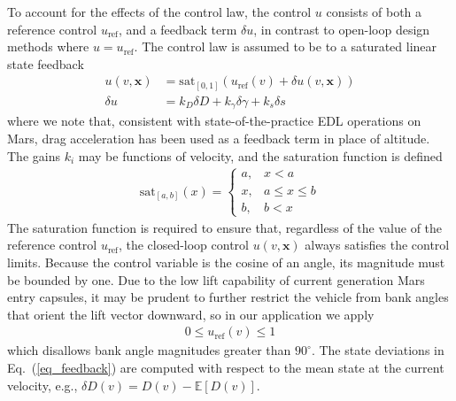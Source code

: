\documentclass[journal ]{new-aiaa}
\newcommand{\state}{\ensuremath{\mathbf{x}}}
\newcommand{\ur}{\ensuremath{u_{\mathrm{ref}}}}
\newcommand{\E}[1]{\mathbb{E}\left[#1\right]}
\begin{document}
To account for the effects of the control law, the control $u$ consists of both a reference control $\ur$, and a feedback term $\delta u$, in contrast to open-loop design methods where $u=\ur$. 
The control law is assumed to be to a saturated linear state feedback 
\begin{align}
u(v,\state) &= \mathrm{sat}_{[0,1]}\left(\ur(v) + \delta u(v,\state)\right)\\
\delta u &= k_D\delta D + k_{\gamma}\delta\gamma + k_s\delta s \label{eq_feedback}
\end{align}
where we note that, consistent with state-of-the-practice EDL operations on Mars, drag acceleration has been used as a feedback term in place of altitude. The gains $k_i$ may be functions of velocity, and the saturation function is defined
\begin{align*}
\mathrm{sat}_{[a,b]}(x) = \left\{\begin{array}{lc}
        a, &  x < a\\
        x, &  a\le x \le b\\
        b, &  b < x
        \end{array} \right. %
\end{align*}
The saturation function is required to ensure that, regardless of the value of the reference control \ur, the closed-loop control $u(v,\state)$ always satisfies the control limits. Because the control variable is the cosine of an angle, its magnitude must be bounded by one. Due to the low lift capability of current generation Mars entry capsules, it may be prudent to further restrict the vehicle from bank angles that orient the lift vector downward, so in our application we apply
\begin{align}
	0 \le \ur(v) \le 1 \label{eq_control_bounds}
\end{align}
which disallows bank angle magnitudes greater than $90^\circ$.
The state deviations in Eq.~(\ref{eq_feedback}) are computed with respect to the mean state at the current velocity, e.g., $\delta D(v) = D(v) - \E{D(v)}$.
\end{document}
